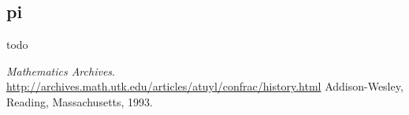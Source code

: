 \documentclass[a4paper]{article}
\begin{document}
\subsection{pi}
todo

\begin{thebibliography}{9}
\textit{Mathematics Archives}. 
\\
\url{http://archives.math.utk.edu/articles/atuyl/confrac/history.html}
Addison-Wesley, Reading, Massachusetts, 1993.


\end{thebibliography}
\end{document}
